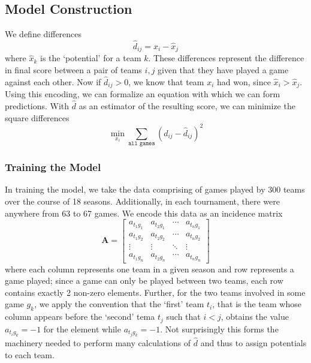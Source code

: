 \documentclass{article} %
\begin{document}
\subsection{Model Construction}
We define differences 
\[
\hat{d}_{ij} = \hat{x}_i - \hat{x}_j
\]
where $\hat{x}_k$ is the `potential' for a team $k$. These differences represent the difference in final score between a pair of teams $i,j$ given that they have played a game against each other. Now if $\hat{d}_{ij} > 0$, we know that team $x_i$ had won, since $\hat{x}_i > \hat{x}_j$. Using this encoding, we can formalize an equation with which we can form predictions. With $\hat{d}$ as an estimator of the resulting score, we can minimize the square differences 
\[
\min_{x_i}\sum_{\texttt{all games}}\left(d_{ij}-\hat{d}_{ij} \right)^2
\]
\subsubsection{Training the Model}
In training the model, we take the data comprising of games played by 300 teams over the course of 18 seasons. Additionally, in each tournament, there were anywhere from 63 to 67 games. We encode this data as an incidence matrix 
\[\mathbf{A} = \begin{bmatrix}
  a_{t_1g_1} & a_{t_2g_1} & \cdots & a_{t_ng_1}\\
  a_{t_1g_2} & a_{t_2g_2} & \cdots & a_{t_ng_2}\\
  \vdots & \vdots & \ddots & \vdots\\
  a_{t_1g_n} & a_{t_2g_n} & \cdots & a_{t_ng_n}
\end{bmatrix} \]
where each column represents one team in a given season and row represents a game played; since a game can only be played between two teams, each row contains exactly 2 non-zero elements. Further, for the two teams involved in some game $g_k$, we apply the convention that the `first' team $t_i$, that is the team whose column appears before the `second' tema $t_j$ such that $i<j$, obtains the value $a_{t_ig_k} = -1$ for the element while $a_{t_jg_k} = -1$. Not surprisingly this forms the machinery needed to perform many calculations of $\hat{d}$ and thus to assign potentials to each team.
\end{document}
